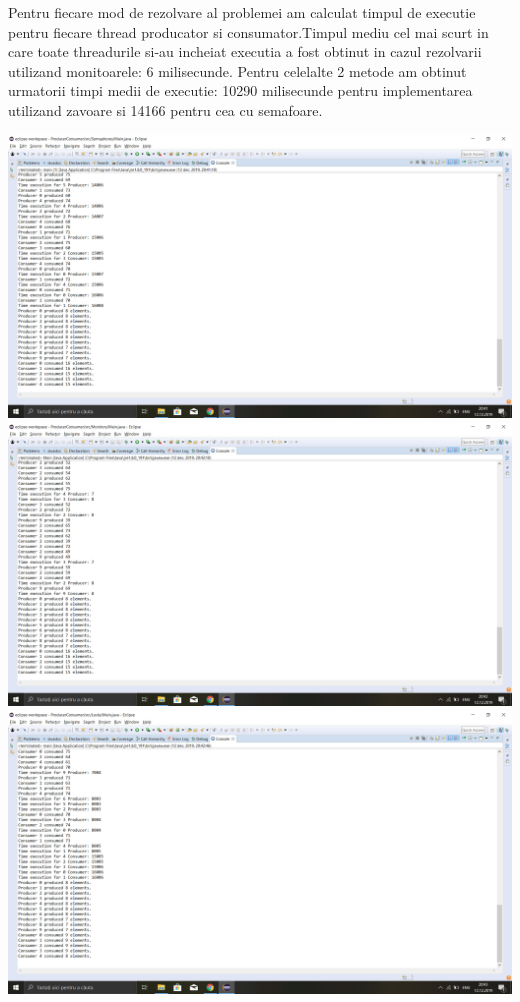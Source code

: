 \documentclass{article}
\begin{document}
\hspace{0.5 cm}
Pentru fiecare mod de rezolvare al problemei am calculat timpul de executie pentru fiecare thread producator si consumator.Timpul mediu cel mai scurt in care toate threadurile si-au incheiat executia a fost obtinut in cazul rezolvarii utilizand monitoarele: 6 milisecunde. Pentru celelalte 2 metode am obtinut urmatorii timpi medii de executie: 10290 milisecunde pentru implementarea utilizand zavoare si 14166 pentru cea cu semafoare.

\includegraphics{PCSemaphores.png}
\includegraphics{PCMonitors.png}
\includegraphics{PCLocks.png}
\end{document}
